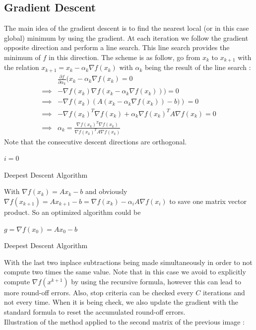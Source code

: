 \documentclass[a4paper]{report}
\begin{document}
\subsection{Gradient Descent}
The main idea of the gradient descent is to find the nearest local (or in this case global) minimum by using the gradient. At each iteration we follow the gradient opposite direction and perform a line search. This line search provides the minimum of $f$ in this direction. The scheme is as follow, go from $x_k$ to $x_{k+1}$ with the relation $x_{k+1}=x_k-\alpha_k\nabla f(x_k)$ with $\alpha_k$ being the result of the line search :
\begin{align*}
&\frac{\partial f}{\partial \alpha_k}(x_k-\alpha_k \nabla f(x_k) =0\\
\implies &- \nabla f(x_k) \nabla f(x_k-\alpha_k \nabla f(x_k))) =0 \\
\implies&- \nabla f(x_k)\left( A(x_k-\alpha_k \nabla f(x_k))-b)  \right) =0 \\
\implies&- \nabla f(x_k)^T \nabla f(x_k)+\alpha_k \nabla f(x_k)^TA \nabla f(x_k)=0\\
\implies&\alpha_k = \frac{\nabla f(x_k)^T \nabla f(x_k)}{ \nabla f(x_k)^TA \nabla f(x_k)}
\end{align*}
Note that the consecutive descent directions are orthogonal.
\\
\begin{algorithm}[H]
 $i=0$\;
 \caption{Deepest Descent Algorithm}
\end{algorithm}
With $\nabla f(x_k)=Ax_k-b$ and obviously
 $\nabla f(x_{k+1})=A x_{k+1}-b =   \nabla f(x_k)- \alpha_i  A \nabla   f(x_i)$ to save one matrix vector product. So an optimized algorithm could be
 \\

\begin{algorithm}[H]
  $g=\nabla f(x_0)=Ax_0-b$\;
 \caption{Deepest Descent Algorithm}
\end{algorithm}
With the last two inplace subtractions being made simultaneously in order to not compute two times the same value. Note that in this case we avoid to explicitly compute $\nabla f(x^{k+1})$ by using the recursive formula, however this can lead to more round-off errors.
Also, stop criteria can be checked every $C$ iterations and not every time. When it is being check, we also update the gradient with the standard formula to reset the accumulated round-off errors.
\\
Illustration of the method applied to the second matrix of the previous image :
\end{document}
